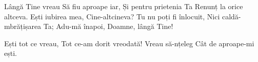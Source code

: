 \beginverse
Lângă Tine vreau
Să fiu aproape iar,
Și pentru prietenia Ta
Renunț la orice altceva.
Ești iubirea mea,
Cine-altcineva?
Tu nu poți fi înlocuit,
Nici caldă-mbrățișarea Ta;
Adu-mă înapoi,
Doamne, lângă Tine!
\endverse

\beginchorus
Ești tot ce vreau,
Tot ce-am dorit vreodată!
Vreau să-nțeleg
Cât de aproape-mi ești.
\endchorus
\endsong